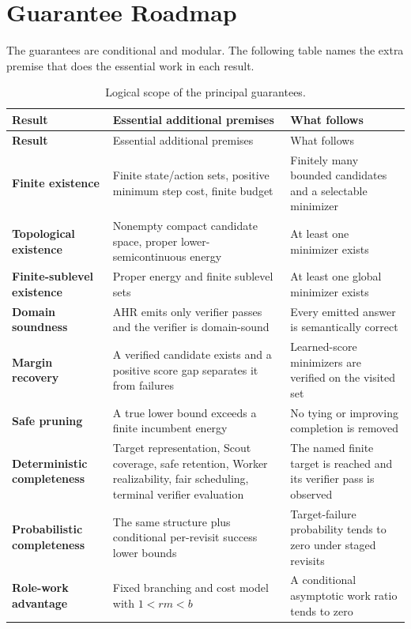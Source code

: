 \documentclass[11pt,oneside]{book}
\theoremstyle{remark}
\begin{document}
\chapter*{Guarantee Roadmap}

The guarantees are conditional and modular. The following table names the
extra premise that does the essential work in each result.

\begin{longtable}{>{\bfseries\RaggedRight\arraybackslash}p{}
>{\RaggedRight\arraybackslash}p{}
>{\RaggedRight\arraybackslash}p{}}
\caption{Logical scope of the principal guarantees.}\\
\toprule
Result & Essential additional premises & What follows \\
\midrule
\endfirsthead
\toprule
Result & Essential additional premises & What follows \\
\midrule
\endhead
Finite existence & Finite state/action sets, positive minimum step cost, finite budget & Finitely many bounded candidates and a selectable minimizer \\
Topological existence & Nonempty compact candidate space, proper lower-semicontinuous energy & At least one minimizer exists \\
Finite-sublevel existence & Proper energy and finite sublevel sets & At least one global minimizer exists \\
Domain soundness & AHR emits only verifier passes and the verifier is domain-sound & Every emitted answer is semantically correct \\
Margin recovery & A verified candidate exists and a positive score gap separates it from failures & Learned-score minimizers are verified on the visited set \\
Safe pruning & A true lower bound exceeds a finite incumbent energy & No tying or improving completion is removed \\
Deterministic completeness & Target representation, Scout coverage, safe retention, Worker realizability, fair scheduling, terminal verifier evaluation & The named finite target is reached and its verifier pass is observed \\
Probabilistic completeness & The same structure plus conditional per-revisit success lower bounds & Target-failure probability tends to zero under staged revisits \\
Role-work advantage & Fixed branching and cost model with $1<rm<b$ & A conditional asymptotic work ratio tends to zero \\
\bottomrule
\end{longtable}
\end{document}
